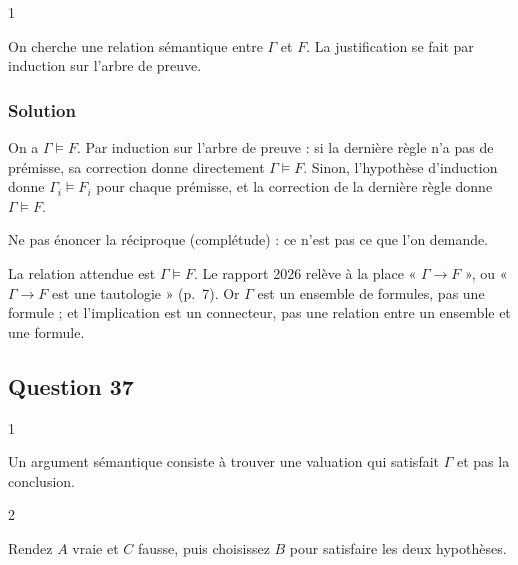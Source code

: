 \documentclass[11pt,a4paper]{article}
\begin{document}
\begin{indication}{1}

On cherche une relation sémantique entre \(\Gamma\) et \(F\). La justification se fait par induction sur l'arbre de preuve.

\end{indication}

\hypertarget{solution-35}{%
\subsubsection{Solution}\label{solution-35}}

On a \(\boxed{\Gamma \models F}\). Par induction sur l'arbre de preuve : si la dernière règle n'a pas de prémisse, sa correction donne directement \(\Gamma \models F\). Sinon, l'hypothèse d'induction donne \(\Gamma_i \models F_i\) pour chaque prémisse, et la correction de la dernière règle donne \(\Gamma \models F\).

\begin{piege}

Ne pas énoncer la réciproque (complétude) : ce n'est pas ce que l'on demande.

\end{piege}

\begin{piege}

La relation attendue est \(\Gamma \models F\). Le rapport 2026 relève à la place « \(\Gamma \to F\) », ou « \(\Gamma \to F\) est une tautologie » (p.~7). Or \(\Gamma\) est un ensemble de formules, pas une formule ; et l'implication est un connecteur, pas une relation entre un ensemble et une formule.

\end{piege}

\hypertarget{question-37}{%
\subsection{Question 37}\label{question-37}}

\begin{indication}{1}

Un argument sémantique consiste à trouver une valuation qui satisfait \(\Gamma\) et pas la conclusion.

\end{indication}

\begin{indication}{2}

Rendez \(A\) vraie et \(C\) fausse, puis choisissez \(B\) pour satisfaire les deux hypothèses.

\end{indication}
\end{document}
